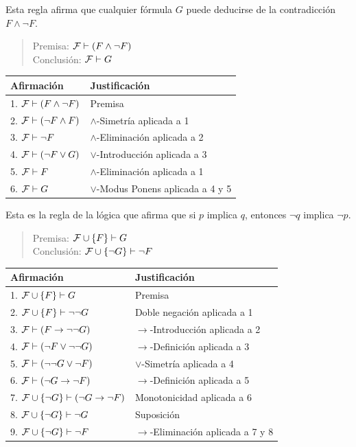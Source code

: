 \message{ !name(main.tex)}\documentclass[12pt,a4paper]{book}
\makeatletter
\newenvironment{derivacion}{%
  \begingroup
  \renewcommand{\arraystretch}{1.35}
  \begin{center}
  \begin{tabular}{@{}l l@{}}
    \textbf{Afirmación} & \textbf{Justificación}\\
    \hline
}{%
  \end{tabular}
  \end{center}
  \endgroup
}
\makeatother
\begin{document}
    \begin{ejemplo}\label{ej:regla-contradiccion}
        Esta regla afirma que cualquier fórmula $G$ puede deducirse de la contradicción $F\wedge\neg F$.

        \begin{quote}
            Premisa: $\mathcal{F}\vdash(F\wedge\neg F)$\\
            Conclusión: $\mathcal{F}\vdash G$
        \end{quote}

        \begin{derivacion}
            1. $\mathcal{F}\vdash(F\wedge\neg F)$ & Premisa\\
            2. $\mathcal{F}\vdash(\neg F\wedge F)$ & $\wedge$-Simetría aplicada a 1\\
            3. $\mathcal{F}\vdash\neg F$ & $\wedge$-Eliminación aplicada a 2\\
            4. $\mathcal{F}\vdash(\neg F\vee G)$ & $\vee$-Introducción aplicada a 3\\
            5. $\mathcal{F}\vdash F$ & $\wedge$-Eliminación aplicada a 1\\
            6. $\mathcal{F}\vdash G$ & $\vee$-Modus Ponens aplicada a 4 y 5\\
        \end{derivacion}
    \end{ejemplo}

    \begin{ejemplo}[Contrapositiva]\label{ej:contrapositiva}
        Esta es la regla de la lógica que afirma que si $p$ implica $q$, entonces $\neg q$ implica $\neg p$.

        \begin{quote}
            Premisa: $\mathcal{F}\cup\{F\}\vdash G$\\
            Conclusión: $\mathcal{F}\cup\{\neg G\}\vdash\neg F$
        \end{quote}

        \begin{derivacion}
            1. $\mathcal{F}\cup\{F\}\vdash G$ & Premisa\\
            2. $\mathcal{F}\cup\{F\}\vdash\neg\neg G$ & Doble negación aplicada a 1\\
            3. $\mathcal{F}\vdash(F\rightarrow\neg\neg G)$ & $\rightarrow$-Introducción aplicada a 2\\
            4. $\mathcal{F}\vdash(\neg F\vee\neg\neg G)$ & $\rightarrow$-Definición aplicada a 3\\
            5. $\mathcal{F}\vdash(\neg\neg G\vee\neg F)$ & $\vee$-Simetría aplicada a 4\\
            6. $\mathcal{F}\vdash(\neg G\rightarrow\neg F)$ & $\rightarrow$-Definición aplicada a 5\\
            7. $\mathcal{F}\cup\{\neg G\}\vdash(\neg G\rightarrow\neg F)$ & Monotonicidad aplicada a 6\\
            8. $\mathcal{F}\cup\{\neg G\}\vdash\neg G$ & Suposición\\
            9. $\mathcal{F}\cup\{\neg G\}\vdash\neg F$ & $\rightarrow$-Eliminación aplicada a 7 y 8\\
        \end{derivacion}
    \end{ejemplo}
\end{document}
